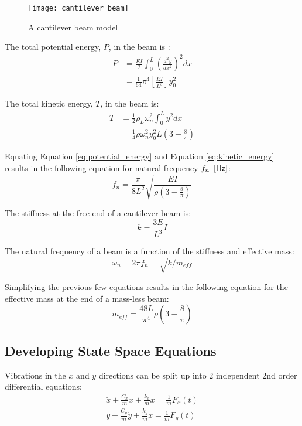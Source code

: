 \begin{figure}
	\centering
	\texttt{[image: cantilever\_beam]}
	\decoRule
	\caption{A cantilever beam model \cite{cantilever_beam_ref}}
	\label{fig:cantilever_beam}
\end{figure}

The total potential energy, $P$, in the beam is \cite{cantilever_beam_ref}:
\begin{align}
	P&=\frac{EI}{2} \int_{0}^{L} \left(\frac{d^2y}{dx^2}\right)^2dx \nonumber \\
	 &=\frac{1}{64}\pi^4 \left[\frac{EI}{L^3}\right] y_0^2 \label{eq:potential_energy}
\end{align}

The total kinetic energy, $T$, in the beam is:
\begin{align}
	T&=\frac{1}{2} \rho_L \omega_n^2 \int_{0}^{L} y^2dx \nonumber \\
	 &=\frac{1}{4} \rho \omega_n^2 y_0^2 L \left(3-\frac{8}{\pi}\right) \label{eq:kinetic_energy}
\end{align}

Equating Equation \ref{eq:potential_energy} and Equation \ref{eq:kinetic_energy} results in the following equation for natural frequency $f_n \ \left[\mathsf{Hz} \right]$:
\begin{equation}
	f_n = \frac{\pi}{8 L^{2}} \sqrt{\frac{E I}{\rho \left(3 - \frac{8}{\pi}\right)}}
\end{equation}

The stiffness at the free end of a cantilever beam is:
\begin{equation}
	k = \frac{3 E}{L^{3}} I \label{eq:beam_stiffness}
\end{equation}

The natural frequency of a beam is a function of the stiffness and effective mass:
\begin{equation}
	\omega_n = 2 \pi f_n = \sqrt{k/m_{eff}}
\end{equation}

Simplifying the previous few equations results in the following equation for the effective mass at the end of a mass-less beam:
\begin{equation}
	m_{eff} = \frac{48 L}{\pi^{4}} \rho \left(3 - \frac{8}{\pi}\right)
\end{equation}

\subsection{Developing State Space Equations}
Vibrations in the $x$ and $y$ directions can be split up into 2 independent 2nd order differential equations:
\begin{align}
	\ddot{x} + \frac{C_x}{m} \dot{x} + \frac{k_x}{m} x = \frac{1}{m} F_x(t) \\
	\ddot{y} + \frac{C_y}{m} \dot{y} + \frac{k_y}{m} x = \frac{1}{m} F_y(t)
\end{align}

